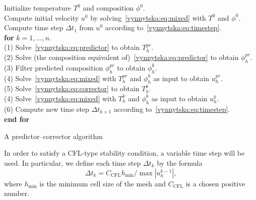 \begin{algorithm}
  \begin{tabbing}
    Initialize temperature $T^0$ and composition $\phi^0$. \\
    Compute initial velocity $u^0$ by
    solving~\eqref{vynnytska:eq:mixed} with $T^0$ and $\phi^0$. \\
    Compute time step $\Delta t_1$ from $u^0$ according
    to~\eqref{vynnytska:eq:timestep}. \\
    \textbf{for}  {$k = 1, \dots, n$}. \\
    \tab (1) Solve~\eqref{vynnytska:eq:predictor} to obtain $T_h^{pr}$. \\
    \tab (2) Solve (the composition equivalent
    of)~\eqref{vynnytska:eq:predictor} to obtain $\phi_h^{pr}$. \\
    \tab (3) Filter predicted composition $\phi_h^{pr}$ to
    obtain $\phi_h^{k}$. \\
    \tab (4) Solve~\eqref{vynnytska:eq:mixed} with $T_h^{pr}$ and
    $\phi_h^{k}$ as input to obtain $u_h^{pr}$. \\
    \tab (5) Solve~\eqref{vynnytska:eq:corrector} to obtain $T_h^{k}$. \\
    \tab (4) Solve~\eqref{vynnytska:eq:mixed} with $T_h^{k}$ and
    $\phi_h^{k}$ as input to obtain $u_h^{k}$. \\
    \tab (6) Compute new time step $\Delta t_{k+1}$ according
    to~\eqref{vynnytska:eq:timestep}. \\
    \textbf{end for}
  \end{tabbing}
  \caption{A predictor--corrector algorithm}
  \label{vynnytska:alg:algorithm}
\end{algorithm}

In order to satisfy a CFL-type stability condition, a variable time
step will be used. In particular, we define each time step $\Delta
t_k$ by the formula
\begin{equation}
   \label{vynnytska:eq:timestep}
   \Delta t_k =  C_{\mathrm{CFL}} h_{\min} / \max{|u^{k-1}_h|},
\end{equation}
where $h_{\min}$ is the minimum cell size of the mesh and
$C_{\mathrm{CFL}}$ is a chosen positive number.

